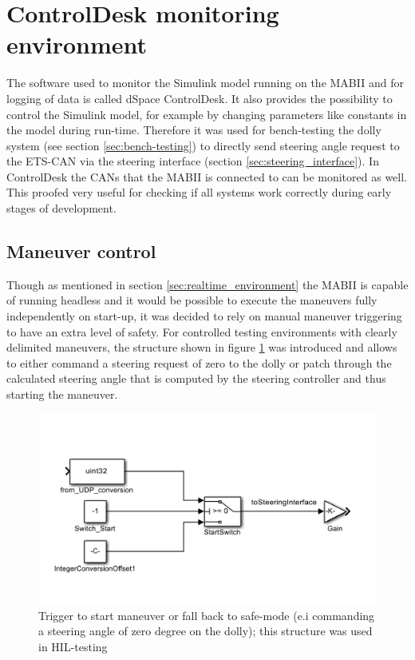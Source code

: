 \documentclass[ExampleMasters.tex]{subfiles}
\begin{document}
\section{ControlDesk monitoring environment}
\label{sec:control_desk}
The software used to monitor the Simulink model running on the \gls{MABII} and for logging of data is called dSpace ControlDesk. It also provides the possibility to control the Simulink model, for example by changing parameters like constants in the model during run-time. Therefore it was used for bench-testing the dolly system (see section \ref{sec:bench-testing}) to directly send steering angle request to the \gls{ETS}-\gls{CAN} via the steering interface (section \ref{sec:steering_interface}). In ControlDesk the \gls{CAN}s that the \gls{MABII} is connected to can be monitored as well. This proofed very useful for checking if all systems work correctly during early stages of development. 

\subsection{Maneuver control}
Though as mentioned in section \ref{sec:realtime_environment} the \gls{MABII} is capable of running headless and it would be possible to execute the maneuvers fully independently on start-up, it was decided to rely on manual maneuver triggering to have an extra level of safety. For controlled testing environments with clearly delimited maneuvers, the structure shown in figure \ref{fig:controlDesk_trigger} was introduced and allows to either command a steering request of zero to the dolly or patch through the calculated steering angle that is computed by the steering controller and thus starting the maneuver. 

\begin{figure}[!htb]
	\centering
	\includegraphics[width=0.6\linewidth]{figures/controlDesk_trigger}
	\caption[Trigger to start maneuver or fall back to safe-mode (e.i commanding a steering angle of zero degree on the dolly); this structure was used in \acrshort{HIL}-testing]{Trigger to start maneuver or fall back to safe-mode (e.i commanding a steering angle of zero degree on the dolly); this structure was used in \gls{HIL}-testing}
	\label{fig:controlDesk_trigger}
\end{figure}
\end{document}
